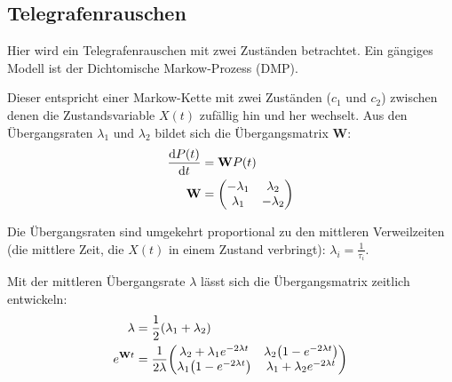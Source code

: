 \documentclass[main.tex]{subfiles}
\begin{document}
\subsection{Telegrafenrauschen}



Hier wird ein Telegrafenrauschen mit zwei Zuständen betrachtet.
Ein gängiges Modell ist der Dichtomische Markow-Prozess (DMP).

Dieser entspricht einer Markow-Kette mit zwei Zuständen (\(c_1\) und \(c_2\))
zwischen denen die Zustandsvariable \(X(t)\) zufällig hin und her wechselt. Aus
den Übergangsraten \(\lambda_1\) und \(\lambda_2\) bildet sich die
Übergangsmatrix \(\mathbf{W}\):
\begin{align}
	\dv{P(t)}{t} & = \mathbf{W} P(t) \\
	\mathbf{W}   & = \mqty(
	-\lambda_1   & \lambda_2         \\
	\lambda_1    & -\lambda_2)
\end{align}

Die Übergangsraten sind umgekehrt proportional zu den mittleren Verweilzeiten
(die mittlere Zeit, die \(X(t)\) in einem Zustand verbringt): \(\lambda_i =
\frac{1}{\tau_i}\).

Mit der mittleren Übergangsrate \(\lambda\) lässt sich die Übergangsmatrix
zeitlich entwickeln:
\begin{align}
	\lambda                            & = \frac{1}{2} \qty(\lambda_1 +
	\lambda_2)
	\\
	e^{\mathbf{W}t}                    & = \frac{1}{2\lambda}
	\mqty(\lambda_2 + \lambda_1
	e^{-2\lambda t}                    & \lambda_2 \qty(1- e^{-2\lambda t})
	\\
	\lambda_1 \qty(1- e^{-2\lambda t}) & \lambda_1 + \lambda_2 e^{-2\lambda
			t})
\end{align}
\end{document}
